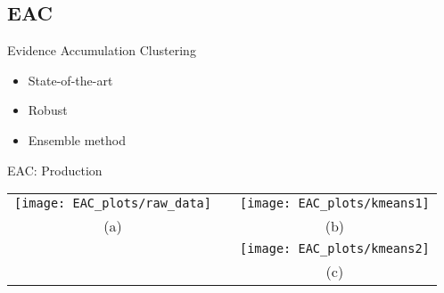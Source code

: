 \subsection{EAC}
\begin{frame}{Evidence Accumulation Clustering}

\begin{itemize}
	\item State-of-the-art

	\item Robust

	\item Ensemble method





\end{itemize}

\end{frame} 

\begin{frame}{EAC: Production}

\centering
\begin{tabular}{ccc}
  \texttt{[image: EAC\_plots/raw\_data]} &  & \texttt{[image: EAC\_plots/kmeans1]} \\
 
   {\tiny (a)} & & {\tiny (b)} \\

  & &  \texttt{[image: EAC\_plots/kmeans2]} \\

  & & {\tiny (c)} \\
\end{tabular}


\end{frame}




